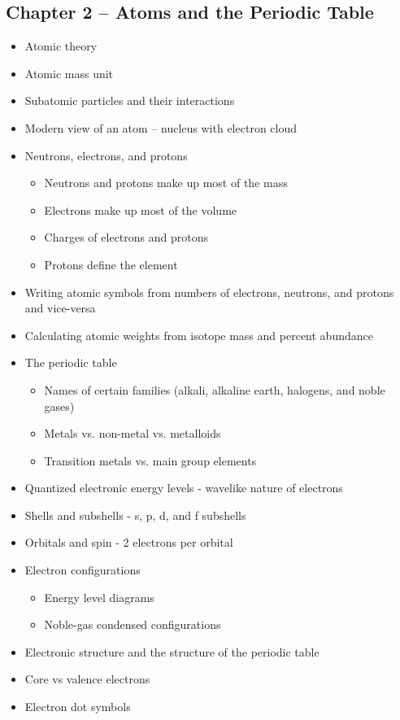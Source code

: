 \documentclass[12pt, letterpaper]{memoir}
\begin{document}
	\subsection*{Chapter 2 -- Atoms and the Periodic Table}
	\begin{itemize}
		\item Atomic theory
		\item Atomic mass unit
		\item Subatomic particles and their interactions		
		\item Modern view of an atom -- nucleus with electron cloud
		\item Neutrons, electrons, and protons
		\begin{itemize}
			\item Neutrons and protons make up most of the mass
			\item Electrons make up most of the volume
			\item Charges of electrons and protons
			\item Protons define the element
		\end{itemize}
		\item Writing atomic symbols from numbers of electrons, neutrons, and protons and vice-versa
		\item Calculating atomic weights from isotope mass and percent abundance
		\item The periodic table
		\begin{itemize}
			\item Names of certain families (alkali, alkaline earth, halogens, and noble gases)
			\item Metals vs. non-metal vs. metalloids
			\item Transition metals vs. main group elements
		\end{itemize}
		\item Quantized electronic energy levels - wavelike nature of electrons
		\item Shells and subshells - s, p, d, and f subshells
		\item Orbitals and spin - 2 electrons per orbital
		\item Electron configurations
		\begin{itemize}
			\item Energy level diagrams
			\item Noble-gas condensed configurations
		\end{itemize}
		\item Electronic structure and the structure of the periodic table
		\item Core vs valence electrons
		\item Electron dot symbols
	\end{itemize}	
\end{document}
